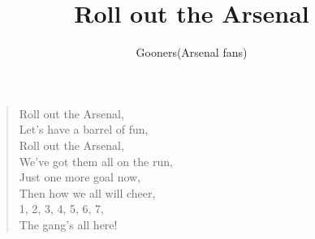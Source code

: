 \documentclass[a4paper,12pt]{article}
\title{Roll out the Arsenal}
\author{Gooners(Arsenal fans)}
\date{}
\begin{document}
	
	\maketitle
	
	\begin{verse}
		
		Roll out the Arsenal, \\
		Let's have a barrel of fun, \\
		Roll out the Arsenal, \\
		We've got them all on the run, \\
		Just one more goal now, \\
		Then how we all will cheer, \\
		1, 2, 3, 4, 5, 6, 7, \\
		The gang's all here!
		
	\end{verse}
	
\end{document}
